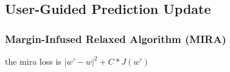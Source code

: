 \subsection{User-Guided Prediction Update}


\subsubsection{Margin-Infused Relaxed Algorithm (MIRA)}
the mira loss is $|w' - w|^2 + C * J(w')$
